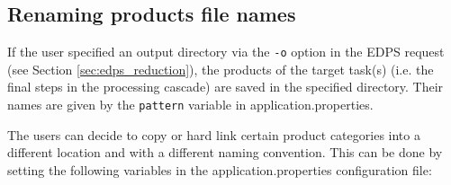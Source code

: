 \subsection{Renaming products file names}
\label{sec:edps_product_names}

If the user specified an output directory via the {\tt -o} option in the EDPS request (see Section \ref{sec:edps_reduction}), 
the products of the target task(s) (i.e. the final steps in the processing cascade) are saved in the specified directory.  Their names are given by the {\tt pattern} variable in application.properties.


The users can decide to copy or hard link certain product categories into a different location and with a different naming convention. This can be done by setting the following variables in the application.properties configuration file:
